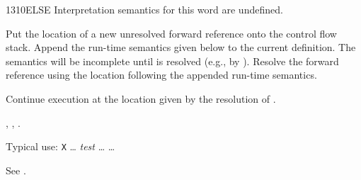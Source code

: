\vspace*{-3ex}
\begin{worddef}{1310}{ELSE}
\vspace*{-2ex}
\interpret
	Interpretation semantics for this word are undefined.

\compile

	Put the location of a new unresolved forward reference
	 onto the control flow stack. Append the run-time
	semantics given below to the current definition. The semantics
	will be incomplete until  is resolved (e.g., by
	). Resolve the forward reference  using
	the location following the appended run-time semantics.

\runtime
	\stack{}{}

	Continue execution at the location given by the resolution of
	.

\see {},
	,
	.

	\begin{rationale} %
		Typical use:
			\word{:} \texttt{X} {\ldots}
				\emph{test}  {\ldots}
				 {\ldots} 
			\word{;}
	\end{rationale}

	\begin{testing} %
		See .
	\end{testing}
\end{worddef}

